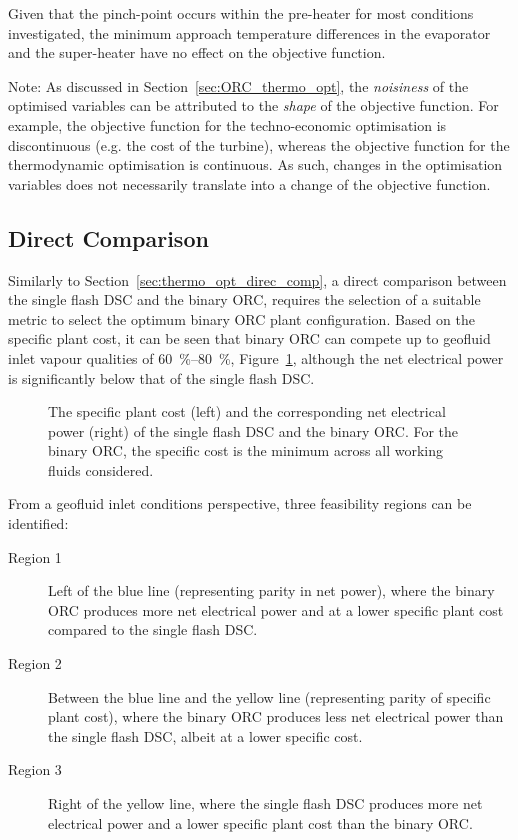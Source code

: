     Given that the pinch-point occurs within the pre-heater for most conditions investigated, the minimum approach temperature differences in the evaporator and the super-heater have no effect on the objective function.

    \begin{notes}{Note:}
        As discussed in Section~\ref{sec:ORC_thermo_opt}, the \emph{noisiness} of the optimised variables can be attributed to the \emph{shape} of the objective function. For example, the objective function for the techno-economic optimisation is discontinuous (e.g. the cost of the turbine), whereas the objective function for the thermodynamic optimisation is continuous. As such, changes in the optimisation variables does not necessarily translate into a change of the objective function.
    \end{notes}

\subsection{Direct Comparison}
    Similarly to Section~\ref{sec:thermo_opt_direc_comp}, a direct comparison between the single flash \ac{DSC} and the binary \ac{ORC}, requires the selection of a suitable metric to select the optimum binary ORC plant configuration. Based on the specific plant cost, it can be seen that binary \ac{ORC} can compete up to geofluid inlet vapour qualities of \qtyrange{60}{80}{\percent}, Figure~\ref{fig:prosim_purewater_SpecCost_DSC_vs_ORC_techno}, although the net electrical power is significantly below that of the single flash \ac{DSC}.

    \begin{figure}[H]
        \centering
        
        \caption[The specific plant cost and the corresponding net electrical power of the single flash \ac{DSC} and the binary \ac{ORC}.]{The specific plant cost (left) and the corresponding net electrical power (right) of the single flash \ac{DSC} and the binary \ac{ORC}. For the binary \ac{ORC}, the specific cost is the minimum across all working fluids considered.}
        \label{fig:prosim_purewater_SpecCost_DSC_vs_ORC_techno}
    \end{figure}

    From a geofluid inlet conditions perspective, three feasibility regions can be identified:
    \begin{description}
       \item[Region 1] Left of the blue line (representing parity in net power), where the binary \ac{ORC} produces more net electrical power and at a lower specific plant cost compared to the single flash \ac{DSC}. 
       \item[Region 2] Between the blue line and the yellow line (representing parity of specific plant cost), where the binary \ac{ORC} produces less net electrical power than the single flash \ac{DSC}, albeit at a lower specific cost.
       \item[Region 3] Right of the yellow line, where the single flash \ac{DSC} produces more net electrical power and a lower specific plant cost than the binary \ac{ORC}.
    \end{description}

